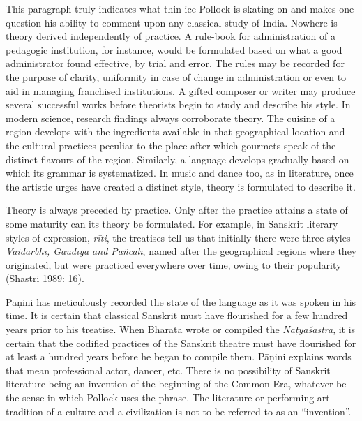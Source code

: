 This paragraph truly indicates what thin ice Pollock is skating on and makes one question his ability to comment upon any classical study of India. Nowhere is theory derived independently of practice. A rule-book for administration of a pedagogic institution, for instance, would be formulated based on what a good administrator found effective, by trial and error. The rules may be recorded for the purpose of clarity, uniformity in case of change in administration or even to aid in managing franchised institutions. A gifted composer or writer may produce several successful works before theorists begin to study and describe his style. In modern science, research findings always corroborate theory. The cuisine of a region develops with the ingredients available in that geographical location and the cultural practices peculiar to the place after which gourmets speak of the distinct flavours of the region. Similarly, a language develops gradually based on which its grammar is systematized. In music and dance too, as in literature, once the artistic urges have created a distinct style, theory is formulated to describe it.

Theory is always preceded by practice. Only after the practice attains a state of some maturity can its theory be formulated. For example, in Sanskrit literary styles of expression, \textit{rīti}, the treatises tell us that initially there were three styles \textit{Vaidarbhī, Gaudīyā and Pāñcālī}, named after the geographical regions where they originated, but were practiced everywhere over time, owing to their popularity (Shastri 1989: 16).

Pāṇini has meticulously recorded the state of the language as it was spoken in his time. It is certain that classical Sanskrit must have flourished for a few hundred years prior to his treatise. When Bharata wrote or compiled the \textit{Nāṭyaśāstra}, it is certain that the codified practices of the Sanskrit theatre must have flourished for at least a hundred years before he began to compile them. Pāṇini explains words that mean professional actor, dancer, etc. There is no possibility of Sanskrit literature being an invention of the beginning of the Common Era, whatever be the sense in which Pollock uses the phrase. The literature or performing art tradition of a culture and a civilization is not to be referred to as an “invention”.

\vspace{-.3cm}

